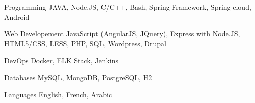 

\begin{cvskills}


\cvskill
{Programming} %
{JAVA, Node.JS, C/C++, Bash, Spring Framework, Spring cloud, Android} %


\cvskill
{Web Developement} %
{JavaScript (AngularJS, JQuery), Express with Node.JS, HTML5/CSS, LESS, PHP, SQL, Wordpress, Drupal} %

\cvskill
{DevOps} %
{Docker, ELK Stack, Jenkins} %

\cvskill
{Databases} %
{MySQL, MongoDB, PostgreSQL, H2} %


\cvskill
{Languages} %
{English, French, Arabic} %


\end{cvskills}
